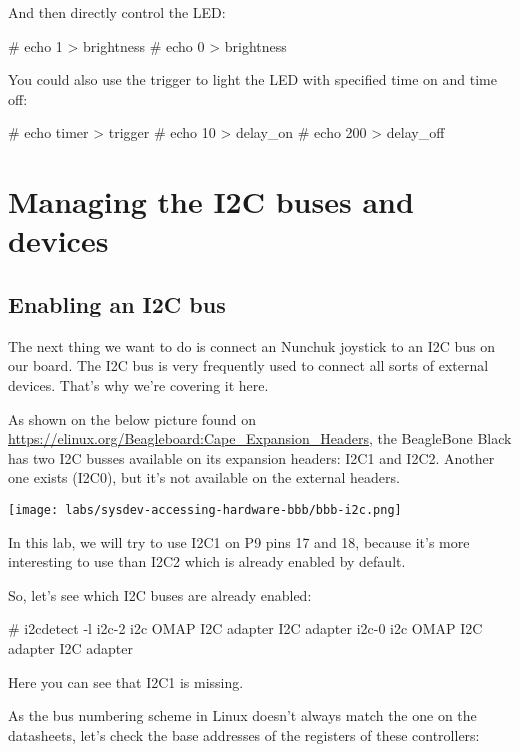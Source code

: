 {And then directly control the LED:

\begin{bashinput}
# echo 1 > brightness
# echo 0 > brightness
\end{bashinput}

You could also use the  trigger to light the LED
with specified time on and time off:

\begin{bashinput}
# echo timer > trigger
# echo 10 > delay_on
# echo 200 > delay_off
\end{bashinput}

\section{Managing the I2C buses and devices}

\subsection{Enabling an I2C bus}

The next thing we want to do is connect an Nunchuk joystick
to an I2C bus on our board. The I2C bus is very frequently used
to connect all sorts of external devices. That's why we're covering
it here.

As shown on the below picture found on
\url{https://elinux.org/Beagleboard:Cape_Expansion_Headers}, the
BeagleBone Black has two I2C busses available on its expansion headers:
I2C1 and I2C2. Another one exists (I2C0), but it's not
available on the external headers.

\texttt{[image: labs/sysdev-accessing-hardware-bbb/bbb-i2c.png]}

In this lab, we will try to use I2C1 on P9 pins 17 and 18, because it's more
interesting to use than I2C2 which is already enabled by default.

So, let's see which I2C buses are already enabled:

\begin{bashinput}
# i2cdetect -l
i2c-2	i2c             OMAP I2C adapter                        I2C adapter
i2c-0	i2c             OMAP I2C adapter                        I2C adapter
\end{bashinput}

Here you can see that I2C1 is missing.

As the bus numbering scheme in Linux doesn't always match the one
on the datasheets, let's check the base addresses of the registers
of these controllers:

}

